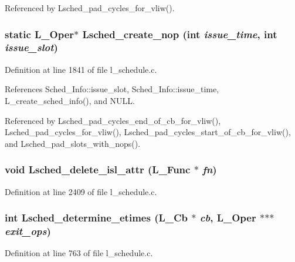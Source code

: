 Referenced by Lsched\_\-pad\_\-cycles\_\-for\_\-vliw().
\subsubsection{\setlength{\rightskip}{0pt plus 5cm}static L\_\-Oper$\ast$ Lsched\_\-create\_\-nop (int {\em issue\_\-time}, int {\em issue\_\-slot})\hspace{0.3cm}{\tt  [static]}}\label{l__schedule_8c_29f3519886531eee9bcddfd3d204d364}




Definition at line 1841 of file l\_\-schedule.c.

References Sched\_\-Info::issue\_\-slot, Sched\_\-Info::issue\_\-time, L\_\-create\_\-sched\_\-info(), and NULL.

Referenced by Lsched\_\-pad\_\-cycles\_\-end\_\-of\_\-cb\_\-for\_\-vliw(), Lsched\_\-pad\_\-cycles\_\-for\_\-vliw(), Lsched\_\-pad\_\-cycles\_\-start\_\-of\_\-cb\_\-for\_\-vliw(), and Lsched\_\-pad\_\-slots\_\-with\_\-nops().
\subsubsection{\setlength{\rightskip}{0pt plus 5cm}void Lsched\_\-delete\_\-isl\_\-attr (L\_\-Func $\ast$ {\em fn})}\label{l__schedule_8c_5877322a652d30df0a7ad278ee7d26e6}




Definition at line 2409 of file l\_\-schedule.c.
\subsubsection{\setlength{\rightskip}{0pt plus 5cm}int Lsched\_\-determine\_\-etimes (L\_\-Cb $\ast$ {\em cb}, L\_\-Oper $\ast$$\ast$$\ast$ {\em exit\_\-ops})}\label{l__schedule_8c_d60fd7dc501d262065cd706caf9b6fc8}




Definition at line 763 of file l\_\-schedule.c.

